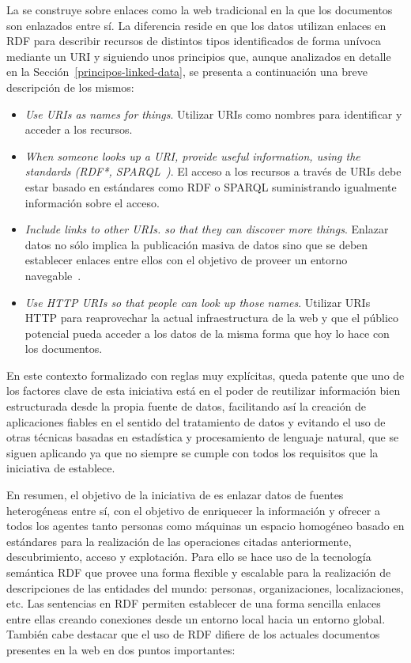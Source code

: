 La \wod se construye sobre enlaces como la web tradicional en la que los documentos son enlazados entre sí. La diferencia
reside en que los datos utilizan enlaces en \gls{RDF} para describir recursos de distintos tipos identificados de forma unívoca
mediante un \gls{URI} y siguiendo unos principios que, aunque analizados en detalle en la Sección~\ref{principos-linked-data}, se presenta a continuación una breve descripción de los mismos:
\begin{itemize}
 \item \textit{Use URIs as names for things}. Utilizar URIs como nombres para identificar y acceder a los recursos.
 \item \textit{When someone looks up a URI, provide useful information, using the standards (RDF*, \gls{SPARQL}~\cite{Sparql})}. El acceso 
a los recursos a través de URIs debe estar basado en estándares como RDF o SPARQL suministrando igualmente información
sobre el acceso.
\item \textit{Include links to other URIs. so that they can discover more things}. Enlazar datos no sólo implica la publicación
masiva de datos sino que se deben establecer enlaces entre ellos con el objetivo de proveer un entorno navegable~\cite{Berners-lee06tabulator:exploring,Pietriga06fresnel}.
\item \textit{Use \gls{HTTP URI}s so that people can look up those names}. Utilizar URIs HTTP para reaprovechar la actual infraestructura
de la web y que el público potencial pueda acceder a los datos de la misma forma que hoy lo hace con los documentos.
\end{itemize}

En este contexto formalizado con reglas muy explícitas, queda patente 
que uno de los factores clave de esta iniciativa está en el poder de reutilizar información bien 
estructurada desde la propia fuente de datos, facilitando así la creación de aplicaciones fiables en el 
sentido del tratamiento de datos y evitando el uso de otras técnicas basadas en estadística y procesamiento
de lenguaje natural, que se siguen aplicando ya que no siempre se cumple con todos los requisitos que la iniciativa de \linkeddata establece.

En resumen, el objetivo de la iniciativa de \linkeddata es enlazar datos de fuentes heterogéneas entre sí, 
con el objetivo de enriquecer la información y ofrecer a todos los agentes tanto personas como máquinas
un espacio homogéneo basado en estándares para la realización de las operaciones citadas anteriormente, descubrimiento, acceso y explotación. 
Para ello se hace uso de la tecnología semántica \gls{RDF} que provee una forma flexible y escalable para la realización de descripciones de las entidades 
del mundo: personas, organizaciones, localizaciones, etc. Las sentencias en RDF permiten
establecer de una forma sencilla enlaces entre ellas creando conexiones desde un entorno local
hacia un entorno global. También cabe destacar que el uso de RDF difiere de los actuales
documentos presentes en la web en dos puntos importantes:

